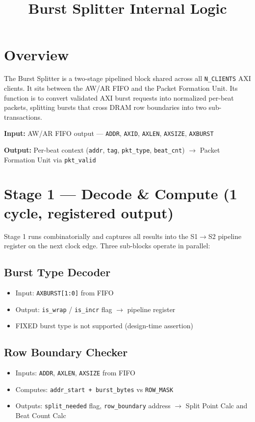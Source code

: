 \documentclass[11pt]{article}
\title{\textbf{Burst Splitter Internal Logic}}
\date{}
\author{}
\begin{document}
\maketitle
\thispagestyle{empty}

\section{Overview}

The Burst Splitter is a two-stage pipelined block shared across all \texttt{N\_CLIENTS} AXI clients. It sits between the AW/AR FIFO and the Packet Formation Unit. Its function is to convert validated AXI burst requests into normalized per-beat packets, splitting bursts that cross DRAM row boundaries into two sub-transactions.

\medskip
\noindent\textbf{Input:} AW/AR FIFO output --- \texttt{ADDR}, \texttt{AXID}, \texttt{AXLEN}, \texttt{AXSIZE}, \texttt{AXBURST}

\noindent\textbf{Output:} Per-beat context (\texttt{addr}, \texttt{tag}, \texttt{pkt\_type}, \texttt{beat\_cnt}) $\rightarrow$ Packet Formation Unit via \texttt{pkt\_valid}

\section{Stage 1 --- Decode \& Compute (1 cycle, registered output)}

Stage 1 runs combinatorially and captures all results into the S1$\rightarrow$S2 pipeline register on the next clock edge. Three sub-blocks operate in parallel:

\subsection{Burst Type Decoder}
\begin{itemize}[noitemsep]
  \item Input: \texttt{AXBURST[1:0]} from FIFO
  \item Output: \texttt{is\_wrap} / \texttt{is\_incr} flag $\rightarrow$ pipeline register
  \item FIXED burst type is not supported (design-time assertion)
\end{itemize}

\subsection{Row Boundary Checker}
\begin{itemize}[noitemsep]
  \item Inputs: \texttt{ADDR}, \texttt{AXLEN}, \texttt{AXSIZE} from FIFO
  \item Computes: \texttt{addr\_start + burst\_bytes} vs \texttt{ROW\_MASK}
  \item Outputs: \texttt{split\_needed} flag, \texttt{row\_boundary} address $\rightarrow$ Split Point Calc and Beat Count Calc
\end{itemize}
\end{document}
